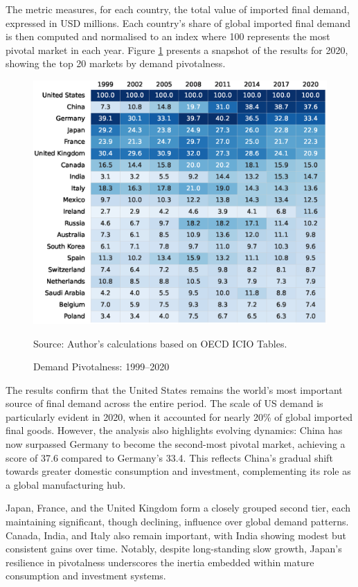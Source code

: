 \documentclass[11pt]{article}
\begin{document}
The metric measures, for each country, the total value of imported final demand, expressed in USD millions. Each country’s share of global imported final demand is then computed and normalised to an index where 100 represents the most pivotal market in each year. Figure \ref{fig:pivotal_demand} presents a snapshot of the results for 2020, showing the top 20 markets by demand pivotalness.

\begin{figure}[H]
	\caption{Demand Pivotalness: 1999–2020}
	\label{fig:pivotal_demand}
	\centering
        \phantom{a}
	\includegraphics[width=\textwidth]{dataviz/results_pivotal3_snapshot.eps}

	{\footnotesize Source: Author's calculations based on OECD ICIO Tables.}
\end{figure}


The results confirm that the United States remains the world's most important source of final demand across the entire period. The scale of US demand is particularly evident in 2020, when it accounted for nearly 20\% of global imported final goods. However, the analysis also highlights evolving dynamics: China has now surpassed Germany to become the second-most pivotal market, achieving a score of 37.6 compared to Germany’s 33.4. This reflects China’s gradual shift towards greater domestic consumption and investment, complementing its role as a global manufacturing hub.

Japan, France, and the United Kingdom form a closely grouped second tier, each maintaining significant, though declining, influence over global demand patterns. Canada, India, and Italy also remain important, with India showing modest but consistent gains over time. Notably, despite long-standing slow growth, Japan’s resilience in pivotalness underscores the inertia embedded within mature consumption and investment systems.
\end{document}
